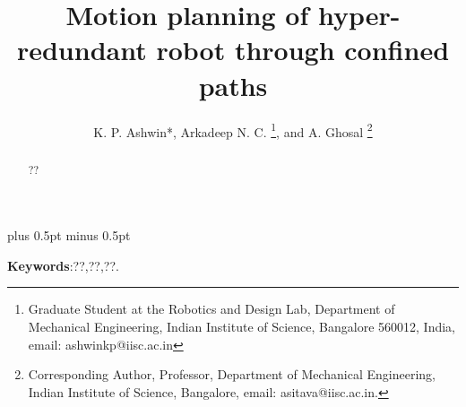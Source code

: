 \documentclass[12pt,a4]{article}
\begin{document}
%
\title{Motion planning of hyper-redundant robot through confined paths}
%
%
\author{K. P. Ashwin*, Arkadeep N. C.
\thanks{Graduate Student at the Robotics and Design Lab, Department
of Mechanical Engineering, Indian Institute of Science, Bangalore 560012, India, email: ashwinkp@iisc.ac.in}, 
 and A. Ghosal
\thanks{Corresponding Author, Professor, Department of Mechanical Engineering, Indian Institute of Science, Bangalore, email: asitava@iisc.ac.in.}}
%
\baselineskip 18pt plus 0.5pt minus 0.5pt
%
\date{}
\maketitle
\begin{abstract}
\label{sec:abstract}
??
\end{abstract}

\textbf{Keywords}:??,??,??.
\end{document}
